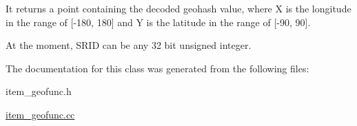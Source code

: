 It returns a point containing the decoded geohash value, where X is the longitude in the range of \mbox{[}-\/180, 180\mbox{]} and Y is the latitude in the range of \mbox{[}-\/90, 90\mbox{]}.

At the moment, S\+R\+ID can be any 32 bit unsigned integer. 

The documentation for this class was generated from the following files\+:\begin{DoxyCompactItemize}
\item 
item\+\_\+geofunc.\+h\item 
\mbox{\hyperlink{item__geofunc_8cc}{item\+\_\+geofunc.\+cc}}\end{DoxyCompactItemize}

